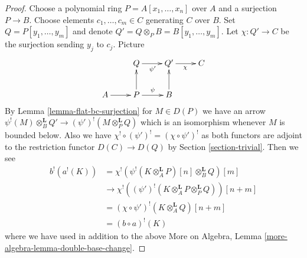 \documentclass[10pt,a4paper]{amsart}
\theoremstyle{plain}
\theoremstyle{definition}
\theoremstyle{remark}
\numberwithin{equation}{subsection}
\begin{document}
\begin{proof}
Choose a polynomial ring $P = A[x_1, \ldots, x_n]$ over $A$
and a surjection $P \to B$. Choose elements $c_1, \ldots, c_m \in C$
generating $C$ over $B$. Set $Q = P[y_1, \ldots, y_m]$ and
denote $Q' = Q \otimes_P B = B[y_1, \ldots, y_m]$.
Let $\chi : Q' \to C$ be the surjection sending $y_j$ to $c_j$.
Picture
$$
\xymatrix{
& Q \ar[r]_{\psi'} & Q' \ar[r]_\chi & C \\
A \ar[r] & P \ar[r]^\psi \ar[u] & B \ar[u]
}
$$
By Lemma \ref{lemma-flat-bc-surjection} for $M \in D(P)$ we have an arrow
$\psi^!(M) \otimes_B^\mathbf{L} Q' \to (\psi')^!(M \otimes_P^\mathbf{L} Q)$
which is an isomorphism whenever $M$ is bounded below. Also
we have $\chi^! \circ (\psi')^! = (\chi \circ \psi')^!$ as both
functors are adjoint to the restriction functor $D(C) \to D(Q)$
by Section \ref{section-trivial}. Then we see
\begin{align*}
b^!(a^!(K))
& =
\chi^!(\psi^!(K \otimes_A^\mathbf{L} P)[n] \otimes_B^\mathbf{L} Q)[m] \\
& \to
\chi^!((\psi')^!(K \otimes_A^\mathbf{L} P \otimes_P^\mathbf{L} Q))[n + m] \\
& =
(\chi \circ \psi')^!(K\otimes_A^\mathbf{L} Q)[n + m] \\
& =
(b \circ a)^!(K)
\end{align*}
where we have used in addition to the above
More on Algebra, Lemma \ref{more-algebra-lemma-double-base-change}.
\end{proof}
\end{document}
